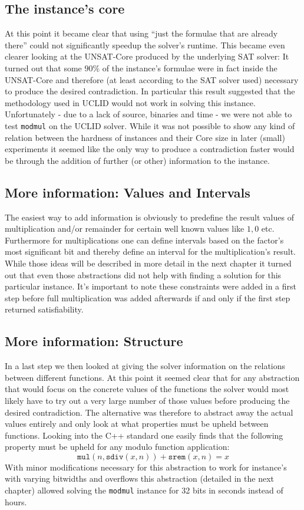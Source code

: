 \subsection{The instance's core}
At this point it became clear that using \enquote{just the formulae that are already there} could not significantly speedup the solver's runtime. This became even clearer looking at the UNSAT-Core produced by the underlying SAT solver: It turned out that some $90\%$ of the instance's formulae were in fact inside the UNSAT-Core and therefore (at least according to the SAT solver used) necessary to produce the desired contradiction.
In particular this result suggested that the methodology used in UCLID  would not work in solving this instance.
Unfortunately - due to a lack of source, binaries and time - we were not able to test \texttt{modmul} on the UCLID solver.
While it was not possible to show any kind of relation between the hardness of instances and their Core size in later (small) experiments it seemed like the only way to produce a contradiction faster would be through the addition of further (or other) information to the instance.

\subsection{More information: Values and Intervals}
The easiest way to add information is obviously to predefine the result values of multiplication and/or remainder for certain well known values like $1,0$ etc. Furthermore for multiplications one can define intervals based on the  factor's most significant bit and thereby define an interval for the multiplication's result. While those ideas will be described in more detail in the next chapter it turned out that even those abstractions did not help with finding a solution for this particular instance. It's important to note these constraints were added in a first step before full multiplication was added afterwards if and only if the first step returned satisfiability.

\subsection{More information: Structure}
In a last step we then looked at giving the solver information on the relations between different functions. At this point it seemed clear that for any abstraction that would focus on the concrete values of the functions the solver would most likely have to try out a very large number of those values before producing the desired contradiction. The alternative was therefore to abstract away the actual values entirely and only look at what properties must be upheld between functions. Looking into the C++ standard  one easily finds that the following property must be upheld for any modulo function application:
\[
    \texttt{mul}\left( n, \texttt{sdiv}\left(x,n\right) \right) + \texttt{srem}\left(x,n\right) = x
\]
With minor modifications necessary for this abstraction to work for instance's with varying bitwidths and overflows this abstraction (detailed in the next chapter) allowed solving the \texttt{modmul} instance for 32 bits in seconds instead of hours.

